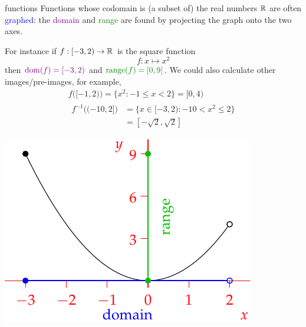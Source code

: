 \begin{examples}{}{functions}
	\exstart Functions whose codomain is (a subset of) the real numbers $\mathbb{R}$ are often \textcolor{blue}{graphed}: the \textcolor{Purple}{domain} and \textcolor{Green}{range} are found by projecting the graph onto the two axes.\par
	\begin{enumerate}\setcounter{enumi}{1}
		\begin{minipage}[t]{0.6\linewidth}\vspace{-8pt}
			\item[]For instance if $f:[-3,2)\to\mathbb{R}$ is the square function
			\[
				f:x\mapsto x^2 \tag{equivalently $f(x)=x^2$}
			\]
			then $\textcolor{Purple}{\dom(f)=[-3,2)}$ and $\textcolor{Green}{\range(f)=[0,9]}$. We could also calculate other images/pre-images, for example,
  		\begin{gather*}
  			f\bigl([-1,2)\bigr)=\bigl\{x^2:-1\le x<2\bigr\}=[0,4)\\[3pt]
  			\begin{aligned}
  				f^{-1}\bigl((-10,2]\bigr)&=\bigl\{x\in[-3,2):-10<x^2\le 2\bigr\}\\
  				&=[-\sqrt 2,\sqrt 2]
  			\end{aligned}
  		\end{gather*}
		\end{minipage}
		\hfill
		\begin{minipage}[t]{0.39\linewidth}\vspace{-8pt}
			\flushright
  		\includegraphics{sets-10-rangedom}
		\end{minipage}
		
 	  \bigbreak
		


\end{enumerate}
\end{examples}
